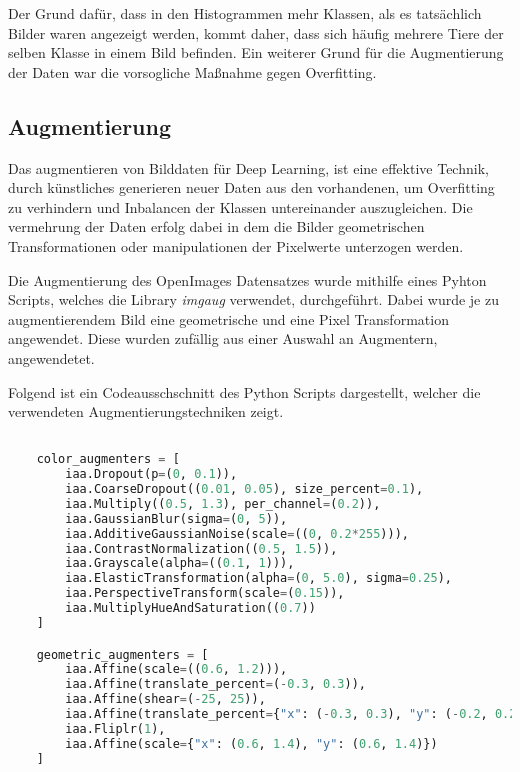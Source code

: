 Der Grund dafür, dass in den Histogrammen mehr Klassen,
als es tatsächlich Bilder 
waren angezeigt werden, kommt daher, dass 
sich häufig mehrere Tiere der selben Klasse in einem Bild 
befinden.
Ein weiterer Grund für die Augmentierung der Daten war 
die vorsogliche Maßnahme gegen Overfitting.




\subsection{Augmentierung}\label{subsec:augmentation}


Das augmentieren von Bilddaten für Deep Learning, 
ist eine effektive Technik, durch künstliches generieren
neuer Daten aus den vorhandenen, um Overfitting zu
verhindern und Inbalancen der Klassen untereinander auszugleichen.
Die vermehrung der Daten erfolg dabei in dem die Bilder 
geometrischen Transformationen oder manipulationen der Pixelwerte 
unterzogen werden.

Die Augmentierung des OpenImages Datensatzes wurde mithilfe 
eines Pyhton Scripts, welches die Library \textit{imgaug} \cite{imgaug}
verwendet, durchgeführt.
Dabei wurde je zu augmentierendem Bild eine geometrische und 
eine Pixel Transformation angewendet.
Diese wurden zufällig aus einer Auswahl an Augmentern, 
angewendetet.

Folgend ist ein Codeausschschnitt des Python Scripts dargestellt, 
welcher die verwendeten Augmentierungstechniken zeigt.


\begin{lstlisting}[language=Python]

    color_augmenters = [
        iaa.Dropout(p=(0, 0.1)),
        iaa.CoarseDropout((0.01, 0.05), size_percent=0.1),
        iaa.Multiply((0.5, 1.3), per_channel=(0.2)),
        iaa.GaussianBlur(sigma=(0, 5)),
        iaa.AdditiveGaussianNoise(scale=((0, 0.2*255))),
        iaa.ContrastNormalization((0.5, 1.5)),
        iaa.Grayscale(alpha=((0.1, 1))),
        iaa.ElasticTransformation(alpha=(0, 5.0), sigma=0.25),
        iaa.PerspectiveTransform(scale=(0.15)),
        iaa.MultiplyHueAndSaturation((0.7))
    ]

    geometric_augmenters = [
        iaa.Affine(scale=((0.6, 1.2))),
        iaa.Affine(translate_percent=(-0.3, 0.3)),
        iaa.Affine(shear=(-25, 25)),
        iaa.Affine(translate_percent={"x": (-0.3, 0.3), "y": (-0.2, 0.2)}),
        iaa.Fliplr(1),
        iaa.Affine(scale={"x": (0.6, 1.4), "y": (0.6, 1.4)})
    ]
    
\end{lstlisting}

